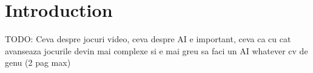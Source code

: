 \chapter{Introduction}

TODO: Ceva despre jocuri video, ceva despre AI e important, ceva ca cu cat avanseaza jocurile devin mai complexe si e mai greu sa faci un AI whatever cv de genu (2 pag max)
